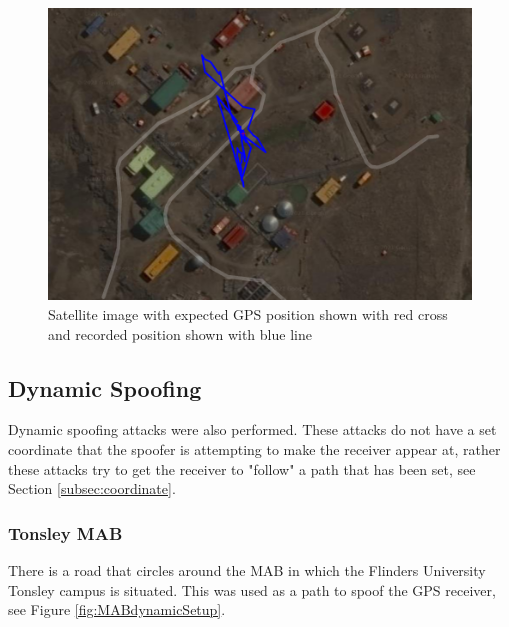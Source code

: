 \begin{figure}[H]
    \begin{centering}
        \includegraphics[width=12cm,keepaspectratio]{Figures/2021_3_30_static_antarctica_Satellite.PNG}
        \caption{Satellite image with expected GPS position shown with red cross and recorded position shown with blue line}
        \label{fig:antarcticaSatelliteImage}
    \end{centering}
\end{figure}

\subsection{Dynamic Spoofing}
Dynamic spoofing attacks were also performed. These attacks do not have a set coordinate that the spoofer is attempting to make the receiver appear at, rather these
attacks try to get the receiver to "follow" a path that has been set, see Section \ref{subsec:coordinate}.
\subsubsection{Tonsley MAB}
There is a road that circles around the MAB in which the Flinders University Tonsley campus is situated. This was used as a path to spoof the GPS receiver,
see Figure \ref{fig:MABdynamicSetup}.

